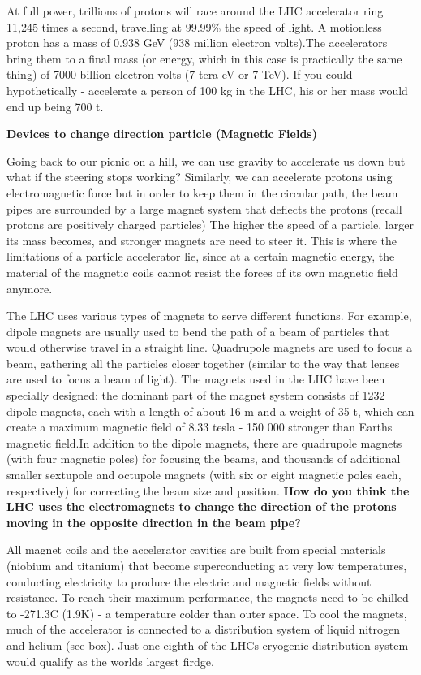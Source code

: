 \;
\noindent
At full power, trillions of protons will race around the LHC accelerator ring 11,245 times a second, travelling at 99.99\% the speed of light. A motionless proton has a mass of 0.938 GeV (938 million electron volts).The accelerators bring them to a final mass (or energy, which in this case is practically the same thing) of 7000 billion electron volts (7 tera-eV or 7 TeV). If you could - hypothetically - accelerate a person of 100 kg in the LHC, his or her mass would end up being 700 t.

\;
\;
\;

\noindent
\textbf{Devices to change direction particle (Magnetic Fields)}

\;
\;

\noindent
Going back to our picnic on a hill, we can use gravity to accelerate us down but what if the steering stops working? Similarly, we can accelerate protons using electromagnetic force but in order to keep them in the circular path, the beam pipes are surrounded by a large magnet system that deflects the protons (recall protons are positively charged particles) The higher the speed of a particle, larger its mass becomes, and stronger magnets are need to steer it. This is where the limitations of a particle accelerator lie, since at a certain magnetic energy, the material of the magnetic coils cannot resist the forces of its own magnetic field anymore. 

\;
\noindent
The LHC uses various types of magnets to serve different functions. For example, dipole magnets are usually used to bend the path of a beam of particles that would otherwise travel in a straight line. Quadrupole magnets are used to focus a beam, gathering all the particles closer together (similar to the way that lenses are used to focus a beam of light). The magnets used in the LHC have been specially designed: the dominant part of the magnet system consists of 1232 dipole magnets, each with a length of about 16 m and a weight of 35 t, which can create a maximum magnetic field of 8.33 tesla - 150 000 stronger than Earths magnetic field.In addition to the dipole magnets, there are quadrupole magnets (with four magnetic poles) for focusing the beams, and thousands of additional smaller sextupole and octupole magnets (with six or eight magnetic poles each, respectively) for correcting the beam size and position. \textbf{How do you think the LHC uses the electromagnets to change the direction of the protons moving in the opposite direction in the beam pipe?}

\;
\noindent
All magnet coils and the accelerator cavities are built from special materials (niobium and titanium) that become superconducting at very low temperatures, conducting electricity to produce the electric and magnetic fields without resistance. To reach their maximum performance, the magnets need to be chilled to -271.3C (1.9K) - a temperature colder than outer space. To cool the magnets, much of the accelerator is connected to a distribution system of liquid nitrogen and helium (see box). Just one eighth of the LHCs cryogenic distribution system would qualify as the worlds largest firdge.


